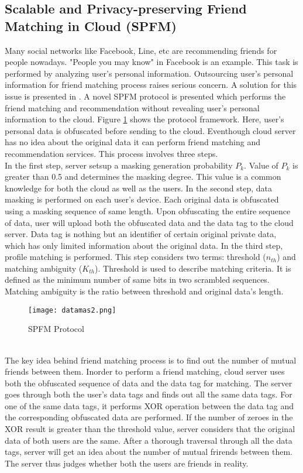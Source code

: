 \documentclass[10pt,a4paper,journal]{IEEEtran}
\begin{document}
\subsection{Scalable and Privacy-preserving Friend Matching in Cloud (SPFM)}
Many social networks like Facebook, Line, etc are recommending friends for people nowadays. "People you may know" in Facebook is an example. This task is performed by analyzing user's personal information. Outsourcing user's personal information for friend matching process raises serious concern. A solution for this issue is presented in \cite{2}. A novel SPFM protocol is presented which performs the friend matching and recommendation without revealing user's personal information to the cloud. Figure \ref{7} shows the protocol framework. Here, user's personal data is obfuscated before sending to the cloud. Eventhough cloud server has no idea about the original data it can perform friend matching and recommendation services. This process involves three steps.\\
\hspace*{2em} In the first step, server setsup a masking generation probability $P_{k}$. Value of $P_{k}$ is greater than 0.5 and determines the masking degree. This value is a common knowledge for both the cloud as well as the users. In the second step, data masking is performed on each user's device. Each original data is obfuscated using a masking sequence of same length. Upon obfuscating the entire sequence of data, user will upload both the obfuscated data and the data tag to the cloud server. Data tag is nothing but an identifier of certain original private data, which has only limited information about the original data. In the third step, profile matching is performed. This step considers two terms: threshold ($n_{th}$) and matching ambiguity ($K_{th}$). Threshold is used to describe matching criteria. It is defined as the minimum number of same bits in two scrambled sequences. Matching ambiguity is the ratio between threshold and original data's length. 
\begin{figure}[htbp]
\centering
\texttt{[image: datamas2.png]} 
\caption{SPFM Protocol \cite{2}}
\label{7}
\end{figure}\\
\hspace*{2em} The key idea behind friend matching process is to find out the number of mutual friends between them. Inorder to perform a friend matching, cloud server uses both the obfuscated sequence of data and the data tag for matching. The server goes through both the user's data tags and finds out all the same data tags. For one of the same data tags, it performs XOR operation between the data tag and the corresponding obfuscated data are performed. If the number of zeroes in the XOR result is greater than the threshold value, server considers that the original data of both  users are the same. After a thorough traversal through all the data tags, server will get an idea about the number of mutual frirends between them. The server thus judges whether both the users are friends in reality.
\end{document}
